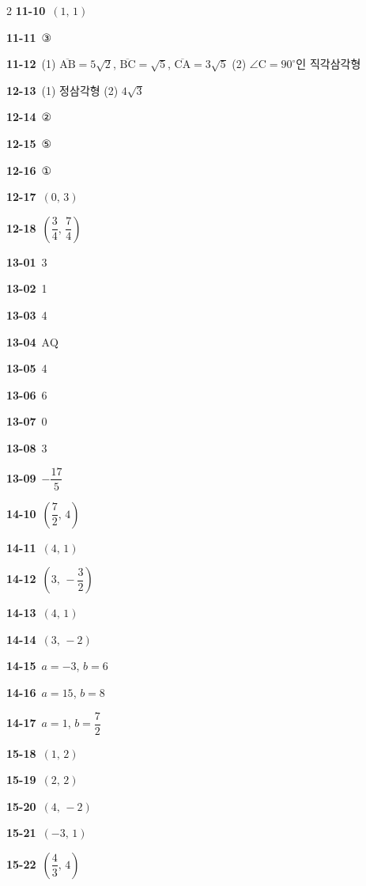\documentclass[10pt,a4paper]{article}
\newcommand{\pt}[1]{\mathrm{#1}}
\newcommand{\seg}[1]{\overline{\mathrm{#1}}}
\begin{document}
\begin{multicols}{2}
\noindent\textbf{11-10}\ $(1,\,1)$\par
\noindent\textbf{11-11}\ ③\par
\noindent\textbf{11-12}\ (1) $\seg{AB}=5\sqrt{2}$, $\seg{BC}=\sqrt{5}$, $\seg{CA}=3\sqrt{5}$ (2) $\angle\pt{C}=90^\circ$인 직각삼각형\par
\noindent\textbf{12-13}\ (1) 정삼각형 (2) $4\sqrt{3}$\par
\noindent\textbf{12-14}\ ②\par
\noindent\textbf{12-15}\ ⑤\par
\noindent\textbf{12-16}\ ①\par
\noindent\textbf{12-17}\ $(0,\,3)$\par
\noindent\textbf{12-18}\ $\left(\dfrac{3}{4},\,\dfrac{7}{4}\right)$\par
\noindent\textbf{13-01}\ 3\par
\noindent\textbf{13-02}\ 1\par
\noindent\textbf{13-03}\ 4\par
\noindent\textbf{13-04}\ $\pt{AQ}$\par
\noindent\textbf{13-05}\ 4\par
\noindent\textbf{13-06}\ 6\par
\noindent\textbf{13-07}\ 0\par
\noindent\textbf{13-08}\ 3\par
\noindent\textbf{13-09}\ $-\dfrac{17}{5}$\par
\noindent\textbf{14-10}\ $\left(\dfrac{7}{2},\,4\right)$\par
\noindent\textbf{14-11}\ $(4,\,1)$\par
\noindent\textbf{14-12}\ $\left(3,\,-\dfrac{3}{2}\right)$\par
\noindent\textbf{14-13}\ $(4,\,1)$\par
\noindent\textbf{14-14}\ $(3,\,-2)$\par
\noindent\textbf{14-15}\ $a=-3$, $b=6$\par
\noindent\textbf{14-16}\ $a=15$, $b=8$\par
\noindent\textbf{14-17}\ $a=1$, $b=\dfrac{7}{2}$\par
\noindent\textbf{15-18}\ $(1,\,2)$\par
\noindent\textbf{15-19}\ $(2,\,2)$\par
\noindent\textbf{15-20}\ $(4,\,-2)$\par
\noindent\textbf{15-21}\ $(-3,\,1)$\par
\noindent\textbf{15-22}\ $\left(\dfrac{4}{3},\,4\right)$\par

\end{multicols}
\end{document}
